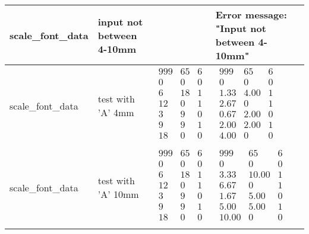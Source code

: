 \begin{longtable}{|>{\raggedright\arraybackslash}m{}|>{\raggedright\arraybackslash}m{}|>{\raggedright\arraybackslash}m{}|>{\raggedright\arraybackslash}m{}|}
    scale\_font\_data & input not between 4-10mm & 11 & Error message: "Input not between 4-10mm" \\ \hline
    scale\_font\_data & test with 'A' 4mm & \footnotesize$\begin{array}{ccc}
        999 &65 &6 \\
        0 &0 &0\\
        6 &18& 1\\
        12 &0& 1\\
        3 &9& 0\\
        9& 9& 1\\
        18 &0& 0\\
        \end{array}$ & \footnotesize$\begin{array}{ccc}
        999 &65 &6 \\
        0 &0 &0\\
        1.33 &4.00& 1\\
        2.67 &0& 1\\
        0.67 &2.00& 0\\
        2.00& 2.00& 1\\
        4.00 &0& 0\\
        \end{array}$ \\ \hline
        scale\_font\_data & test with 'A' 10mm & \footnotesize$\begin{array}{ccc}
            999 &65 &6 \\
            0 &0 &0\\
            6 &18& 1\\
            12 &0& 1\\
            3 &9& 0\\
            9& 9& 1\\
            18 &0& 0\\
            \end{array}$ & \footnotesize$\begin{array}{ccc}
            999 &65 &6 \\
            0 &0 &0\\
            3.33 &10.00& 1\\
            6.67 &0& 1\\
            1.67 &5.00& 0\\
            5.00& 5.00& 1\\
            10.00 &0& 0\\
            \end{array}$ \\ \hline

\end{longtable}
